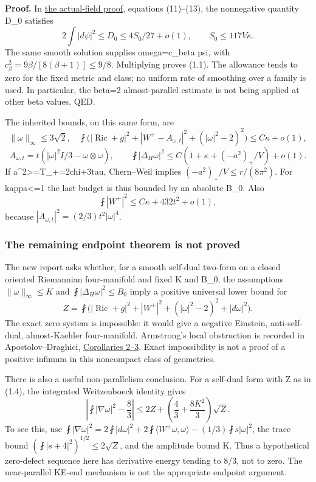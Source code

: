 \documentclass[
  10pt,
]{article}
\begin{document}
\textbf{Proof.} In
\href{../mathematics/current/line1_functional_pencil.md}{the
actual-field proof}, equations (11)--(13), the nonnegative quantity D\_0
satisfies \[
 2\int|d\psi|^2\le D_0\le4S_0/27+o(1),\qquad S_0\le117V\kappa.
\] The same smooth solution supplies omega=c\_beta psi, with
\(c_\beta^2=9\beta/[8(\beta+1)]\le9/8\). Multiplying proves (1.1). The
allowance tends to zero for the fixed metric and class; no uniform rate
of smoothing over a family is used. In particular, the beta=2
almost-parallel estimate is not being applied at other beta values. QED.

The inherited bounds, on this same form, are \[
 \|\omega\|_\infty\le3\sqrt2,\quad
 \fint\bigl(|\operatorname{Ric}+g|^2+|W^+-A_{\omega,t}|^2
                    +( |\omega|^2-2)^2\bigr)\le C\kappa+o(1),
\] \[
 A_{\omega,t}=t(|\omega|^2I/3-\omega\otimes\omega),\qquad
 \fint|\Delta_H\omega|^2\le C(1+\kappa+(-a^2)_+/V)+o(1).    \tag{1.2}
\] If a\^{}2\textgreater=T\_+=2chi+3tau, Chern--Weil implies
\((-a^2)_+/V\le r/(8\pi^2)\). For kappa\textless=1 the last budget is
thus bounded by an absolute B\_0. Also \[
 \fint|W^+|^2\le C\kappa+432t^2+o(1),                    \tag{1.3}
\] because \(|A_{\omega,t}|^2=(2/3)t^2|\omega|^4\).

\hypertarget{the-remaining-endpoint-theorem-is-not-proved}{%
\subsubsection{The remaining endpoint theorem is not
proved}\label{the-remaining-endpoint-theorem-is-not-proved}}

The new report asks whether, for a smooth self-dual two-form on a closed
oriented Riemannian four-manifold and fixed K and B\_0, the assumptions
\(\|\omega\|_\infty\le K\) and \(\fint|\Delta_H\omega|^2\le B_0\) imply
a positive universal lower bound for \[
 Z=\fint\bigl(|\operatorname{Ric}+g|^2+|W^+|^2
                     +( |\omega|^2-2)^2+|d\omega|^2\bigr). \tag{1.4}
\] The exact zero system is impossible: it would give a negative
Einstein, anti-self-dual, almost-Kaehler four-manifold. Armstrong's
local obstruction is recorded in Apostolov--Draghici,
\href{https://arxiv.org/pdf/math/0302152}{Corollaries 2--3}. Exact
impossibility is not a proof of a positive infimum in this noncompact
class of geometries.

There is also a useful non-parallelism conclusion. For a self-dual form
with Z as in (1.4), the integrated Weitzenboeck identity gives \[
 \left|\fint|\nabla\omega|^2-\frac83\right|
 \le2Z+\left(\frac43+\frac{8K^2}{3}\right)\sqrt Z.         \tag{1.5}
\] To see this, use
\(\fint|\nabla\omega|^2=2\fint|d\omega|^2+ 2\fint\langle W^+\omega,\omega\rangle-(1/3)\fint s|\omega|^2\),
the trace bound \((\fint|s+4|^2)^{1/2}\le2\sqrt Z\), and the amplitude
bound K. Thus a hypothetical zero-defect sequence here has derivative
energy tending to 8/3, not to zero. The near-parallel KE-end mechanism
is not the appropriate endpoint argument.
\end{document}
